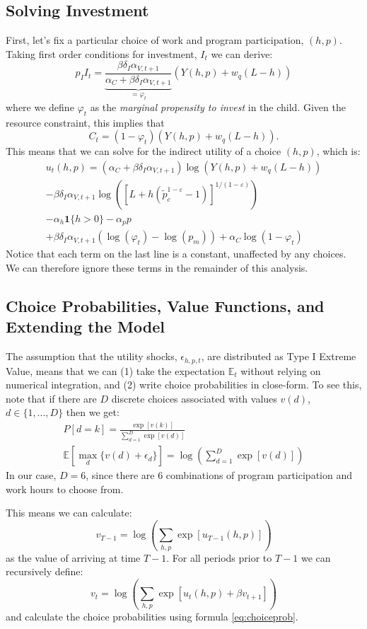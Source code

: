 \documentclass[12pt]{article}
\newcommand\EE{\mathbb{E}}
\newcommand\eps{\epsilon}
\numberwithin{equation}{section}
\numberwithin{figure}{section}
\numberwithin{table}{section}
\begin{document}
\subsection{Solving Investment}
First, let's fix a particular choice of work and program participation, $(h,p)$. Taking first order conditions for investment, $I_t$ we can derive:
\[p_II_t = \underbrace{\frac{\beta\delta_I\alpha_{V,t+1}}{\alpha_C+\beta\delta_I\alpha_{V,t+1}}}_{ = \varphi_{t}}\left(Y(h,p) + w_q(L-h)\right) \]
where we define $\varphi_{t}$ as the \emph{marginal propensity to invest} in the child. Given the resource constraint, this implies that
\[C_t = (1-\varphi_t)(Y(h,p)+w_q(L-h)) .\]
This means that we can solve for the indirect utility of a choice $(h,p)$, which is:
\begin{multline}
u_t(h,p) = (\alpha_C+\beta\delta_{I}\alpha_{V,t+1})\log(Y(h,p)+w_q(L-h)) \\
 - \beta\delta_{I}\alpha_{V,t+1}\log\left([L + h(\tilde{p}_c^{1-\varepsilon}-1)]^{1/(1-\varepsilon)}\right) \\
 - \alpha_h\mathbf{1}\{h>0\} - \alpha_pp \\
 + \beta\delta_I\alpha_{V,t+1}(\log(\varphi_t) - \log(p_m)) + \alpha_C\log(1-\varphi_t) \label{eq:utility}
\end{multline}
Notice that each term on the last line is a constant, unaffected by any choices. We can therefore ignore these terms in the remainder of this analysis.

\subsection{Choice Probabilities, Value Functions, and Extending the Model}
The assumption that the utility shocks, $\eps_{h,p,t}$, are distributed as Type I Extreme Value, means that we can (1) take the expectation $\mathbb{E}_t$ without relying on numerical integration, and (2) write choice probabilities in close-form. To see this, note that if there are $D$ discrete choices associated with values $v(d)$, $d\in\{1,...,D\}$ then we get:
\begin{eqnarray}
P[d=k] = \frac{\exp[v(k)]}{\sum_{d=1}^D\exp[v(d)]} \label{eq:choiceprob} \\
\EE\left[\max_{d}\{v(d)+\eps_d\}\right] = \log\left(\sum_{d=1}^D\exp[v(d)]\right)
\end{eqnarray}
In our case, $D=6$, since there are 6 combinations of program participation and work hours to choose from.

This means we can calculate:
\[v_{T-1} = \log\left(\sum_{h,p}\exp[u_{T-1}(h,p)]\right)\]
as the value of arriving at time $T-1$. For all periods prior to $T-1$ we can recursively define:
\[v_t = \log\left(\sum_{h,p}\exp[u_{t}(h,p) + \beta v_{t+1}]\right)\]
and calculate the choice probabilities using formula \eqref{eq:choiceprob}.
\end{document}
